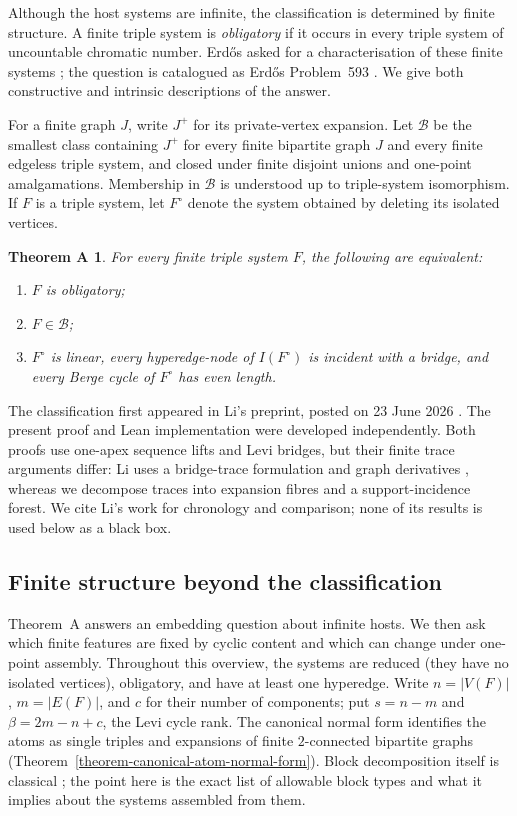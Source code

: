 \documentclass[a4paper,11pt,reqno]{amsart}
\theoremstyle{plain}
\newtheorem*{theoremA}{Theorem A}
\theoremstyle{definition}
\theoremstyle{remark}
\begin{document}
Although the host systems are infinite, the classification is determined by
finite structure.  A finite triple system is \emph{obligatory} if it occurs
in every triple system of uncountable chromatic number.  Erdős asked for a
characterisation of these finite systems \citep{erdos1995}; the question is
catalogued as Erdős Problem~593 \citep{bloom593}.  We give both constructive
and intrinsic descriptions of the answer.

For a finite graph $J$, write $J^+$ for its private-vertex expansion.  Let
$\mathcal B$ be the smallest class containing $J^+$ for every finite
bipartite graph $J$ and every finite edgeless triple system, and closed under
finite disjoint unions and one-point amalgamations.  Membership in
$\mathcal B$ is understood up to triple-system isomorphism.  If $F$ is a
triple system, let $F^\circ$ denote the system obtained by deleting its
isolated vertices.

\begin{theoremA}\label{theorem-a-exact-characterisation}
For every finite triple system $F$, the following are equivalent:
\begin{enumerate}
\item $F$ is obligatory;
\item $F\in\mathcal B$;
\item $F^\circ$ is linear, every hyperedge-node of $I(F^\circ)$ is incident
with a bridge, and every Berge cycle of $F^\circ$ has even length.
\end{enumerate}
\end{theoremA}

The classification first appeared in Li's preprint, posted on 23 June 2026
\citep[Theorem~1.1]{li2026}.  The present proof and Lean implementation were
developed independently.  Both proofs use one-apex sequence lifts and Levi
bridges, but their finite trace arguments differ: Li uses a bridge-trace
formulation and graph derivatives \citep[Sections~3--4 and Theorem~4.6]{li2026},
whereas we decompose traces into expansion fibres and a support-incidence
forest.  We cite Li's work for chronology and comparison; none of its results
is used below as a black box.
\subsection*{Finite structure beyond the classification}
Theorem~A answers an embedding question about infinite hosts.  We then ask
which finite features are fixed by cyclic content and which can change under
one-point assembly.  Throughout this overview, the systems are reduced
(they have no isolated vertices), obligatory, and have at least one
hyperedge.  Write \(n=|V(F)|\), \(m=|E(F)|\), and \(c\) for their number
of components; put \(s=n-m\) and \(\beta=2m-n+c\), the Levi cycle rank.
The canonical normal form identifies the atoms as single triples and expansions
of finite \(2\)-connected bipartite graphs
(Theorem~\ref{theorem-canonical-atom-normal-form}).  Block decomposition itself
is classical \citep{whitney1932,diestel2017}; the point here is the exact list
of allowable block types and what it implies about the systems assembled
from them.
\end{document}
